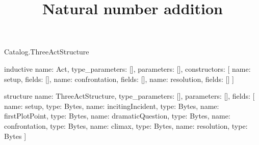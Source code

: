 \begin{lexlean}{Catalog.ThreeActStructure}
\title{Natural number addition}
\begin{semanticmodule}
inductive{
  name: Act,
  type_parameters: [],
  parameters: [],
  constructors: [
    {name: setup, fields: []},
    {name: confrontation, fields: []},
    {name: resolution, fields: []}
  ]
}

structure{
  name: ThreeActStructure,
  type_parameters: [],
  parameters: [],
  fields: [
    {name: setup, type: Bytes},
    {name: incitingIncident, type: Bytes},
    {name: firstPlotPoint, type: Bytes},
    {name: dramaticQuestion, type: Bytes},
    {name: confrontation, type: Bytes},
    {name: climax, type: Bytes},
    {name: resolution, type: Bytes}
  ]
}
\end{semanticmodule}
\end{lexlean}
